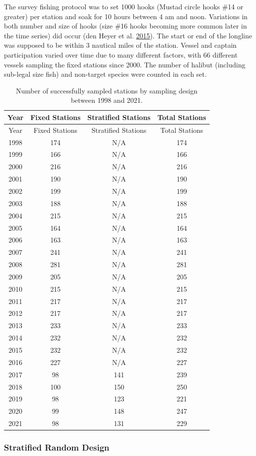 \documentclass[12pt]{article}\usepackage[]{graphicx}\usepackage[]{color}
\begin{document}
The survey fishing protocol was to set 1000 hooks (Mustad circle hooks \#14 or greater) per station and soak for 10 hours between 4 am and noon. Variations in both number and size of hooks (size \#16 hooks becoming more common later in the time series) did occur (den Heyer et al. \protect\hyperlink{ref-DenHeyer2015}{2015}). The start or end of the longline was supposed to be within 3 nautical miles of the station. Vessel and captain participation varied over time due to many different factors, with 66 different vessels sampling the fixed stations since 2000. The number of halibut (including sub-legal size fish) and non-target species were counted in each set.
\begin{longtable}[]{@{}cccc@{}}
\caption{\label{tab:stat-samp}Number of successfully sampled stations by sampling design between 1998 and 2021.}\tabularnewline
\toprule
Year & Fixed Stations & Stratified Stations & Total Stations\tabularnewline
\midrule
\endfirsthead
\toprule
Year & Fixed Stations & Stratified Stations & Total Stations\tabularnewline
\midrule
\endhead
1998 & 174 & N/A & 174\tabularnewline
1999 & 166 & N/A & 166\tabularnewline
2000 & 216 & N/A & 216\tabularnewline
2001 & 190 & N/A & 190\tabularnewline
2002 & 199 & N/A & 199\tabularnewline
2003 & 188 & N/A & 188\tabularnewline
2004 & 215 & N/A & 215\tabularnewline
2005 & 164 & N/A & 164\tabularnewline
2006 & 163 & N/A & 163\tabularnewline
2007 & 241 & N/A & 241\tabularnewline
2008 & 281 & N/A & 281\tabularnewline
2009 & 205 & N/A & 205\tabularnewline
2010 & 215 & N/A & 215\tabularnewline
2011 & 217 & N/A & 217\tabularnewline
2012 & 217 & N/A & 217\tabularnewline
2013 & 233 & N/A & 233\tabularnewline
2014 & 232 & N/A & 232\tabularnewline
2015 & 232 & N/A & 232\tabularnewline
2016 & 227 & N/A & 227\tabularnewline
2017 & 98 & 141 & 239\tabularnewline
2018 & 100 & 150 & 250\tabularnewline
2019 & 98 & 123 & 221\tabularnewline
2020 & 99 & 148 & 247\tabularnewline
2021 & 98 & 131 & 229\tabularnewline
\bottomrule
\end{longtable}
\hypertarget{stratified-random-design}{%
\subsubsection{Stratified Random Design}\label{stratified-random-design}}
\end{document}
